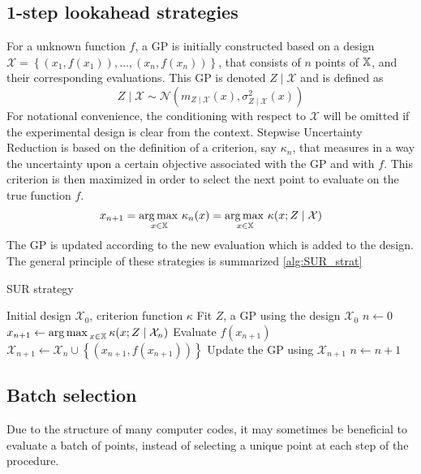 \documentclass[../../Main_ManuscritThese.tex]{subfiles}
\begin{document}
\subsection{1-step lookahead strategies}
For a unknown function $f$, a GP is initially constructed based on a design $\mathcal{X} = \left\{\left(x_1,f(x_1)\right), \dots, \left(x_n, f(x_n)\right)\right\}$, that consists of $n$ points of $\mathbb{X}$, and their corresponding evaluations. This GP is denoted $Z \mid \mathcal{X}$ and is defined as
\begin{equation}
  \label{eq:ZgivenXGP}
  Z\mid \mathcal{X} \sim \mathcal{N}(m_{Z\mid\mathcal{X}}(x),\sigma^2_{Z\mid\mathcal{X}}(x))
\end{equation}
For notational convenience, the conditioning with respect to $\mathcal{X}$ will be omitted if the experimental design is clear from the context.
Stepwise Uncertainty Reduction is based on the definition of a criterion, say $\kappa_n$, that measures in a way the uncertainty upon a certain objective associated with the GP and with $f$. This criterion is then maximized in order to select the next point to evaluate on the true function $f$.
\begin{equation}
  x_{n+1} = \operatorname*{arg\,max \,}_{x\in\mathbb{X}} \kappa_n(x) = \operatorname*{arg\,max \,}_{x\in\mathbb{X}} \kappa(x; Z \mid \mathcal{X})
\end{equation}
The GP is updated according to the new evaluation which is added to the design. The general principle of these strategies is summarized \cref{alg:SUR_strat}

\begin{algorithm}
  \caption{\label{alg:SUR_strat} SUR strategy}
\begin{algorithmic}
\REQUIRE Initial design $\mathcal{X}_0$, criterion function $\kappa$
\STATE Fit $Z$, a GP using the design $\mathcal{X}_0$
\STATE $n \leftarrow 0$
\STATE $x_{n+1} \leftarrow \operatorname*{arg\,max \,}_{x \in \mathbb{X}} \kappa(x; Z \mid \mathcal{X}_{n})$
\STATE Evaluate $f(x_{n+1})$
\STATE $\mathcal{X}_{n+1} \leftarrow \mathcal{X}_n \cup \left\{\left(x_{n+1}, f(x_{n+1})\right)\right\}$
\STATE Update the GP using $\mathcal{X}_{n+1}$
\STATE $n \leftarrow n + 1$
\ENDWHILE
\end{algorithmic}
\end{algorithm}


\subsection{Batch selection}
Due to the structure of many computer codes, it may sometimes be beneficial to evaluate a batch of points, instead of selecting a unique point at each step of the procedure.
\end{document}
